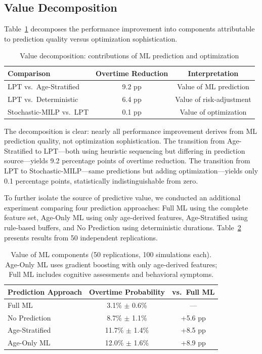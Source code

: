 \documentclass[11pt,a4paper]{article}
\begin{document}
\subsection{Value Decomposition}
\label{sec:value_analysis}

Table~\ref{tab:value_analysis} decomposes the performance improvement into components attributable to prediction quality versus optimization sophistication.

\begin{table}[htbp]
\centering
\caption{Value decomposition: contributions of ML prediction and optimization}
\label{tab:value_analysis}
\begin{tabular}{@{}lcc@{}}
\toprule
\textbf{Comparison} & \textbf{Overtime Reduction} & \textbf{Interpretation} \\
\midrule
LPT vs.\ Age-Stratified & 9.2 pp & Value of ML prediction \\
LPT vs.\ Deterministic & 6.4 pp & Value of risk-adjustment \\
Stochastic-MILP vs.\ LPT & 0.1 pp & Value of optimization \\
\bottomrule
\end{tabular}
\end{table}

The decomposition is clear: nearly all performance improvement derives from ML prediction quality, not optimization sophistication. The transition from Age-Stratified to LPT---both using heuristic sequencing but differing in prediction source---yields 9.2 percentage points of overtime reduction. The transition from LPT to Stochastic-MILP---same predictions but adding optimization---yields only 0.1 percentage points, statistically indistinguishable from zero.

To further isolate the source of predictive value, we conducted an additional experiment comparing four prediction approaches: Full ML using the complete feature set, Age-Only ML using only age-derived features, Age-Stratified using rule-based buffers, and No Prediction using deterministic durations. Table~\ref{tab:ml_value} presents results from 50 independent replications.

\begin{table}[htbp]
\centering
\caption{Value of ML components (50 replications, 100 simulations each). Age-Only ML uses gradient boosting with only age-derived features; Full ML includes cognitive assessments and behavioral symptoms.}
\label{tab:ml_value}
\begin{tabular}{@{}lcc@{}}
\toprule
\textbf{Prediction Approach} & \textbf{Overtime Probability} & \textbf{vs.\ Full ML} \\
\midrule
Full ML & 3.1\% $\pm$ 0.6\% & --- \\
No Prediction & 8.7\% $\pm$ 1.1\% & +5.6 pp \\
Age-Stratified & 11.7\% $\pm$ 1.4\% & +8.5 pp \\
Age-Only ML & 12.0\% $\pm$ 1.6\% & +8.9 pp \\
\bottomrule
\end{tabular}
\end{table}
\end{document}
